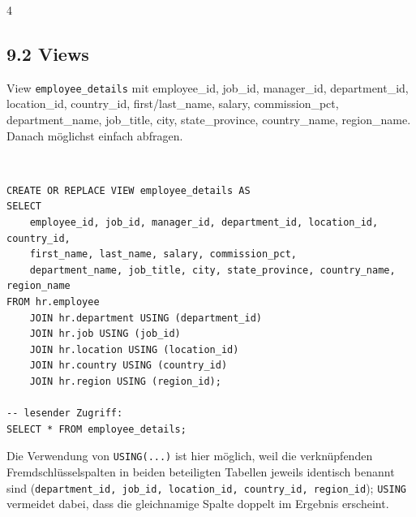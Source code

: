 \documentclass[8pt,a4paper]{extarticle}
\newenvironment{loesung}[1][]{%
    \par\noindent{\bfseries\color{loesungrahmen}\small$\blacktriangleright$~L\"osung#1:}~%
}{\par\smallskip}
\begin{document}
\begin{multicols}{4}
\subsection*{9.2 \quad Views}
View \texttt{employee\_details} mit employee\_id, job\_id, manager\_id, department\_id, location\_id, country\_id, first/last\_name, salary, commission\_pct, department\_name, job\_title, city, state\_province, country\_name, region\_name. Danach m\"oglichst einfach abfragen.
\begin{loesung}
\begin{lstlisting}
CREATE OR REPLACE VIEW employee_details AS
SELECT
    employee_id, job_id, manager_id, department_id, location_id, country_id,
    first_name, last_name, salary, commission_pct,
    department_name, job_title, city, state_province, country_name, region_name
FROM hr.employee
    JOIN hr.department USING (department_id)
    JOIN hr.job USING (job_id)
    JOIN hr.location USING (location_id)
    JOIN hr.country USING (country_id)
    JOIN hr.region USING (region_id);

-- lesender Zugriff:
SELECT * FROM employee_details;
\end{lstlisting}
Die Verwendung von \texttt{USING(...)} ist hier m\"oglich, weil die verkn\"upfenden Fremdschl\"usselspalten in beiden beteiligten Tabellen jeweils identisch benannt sind (\texttt{department\_id, job\_id, location\_id, country\_id, region\_id}); \texttt{USING} vermeidet dabei, dass die gleichnamige Spalte doppelt im Ergebnis erscheint.
\end{loesung}



\end{multicols}
\end{document}
